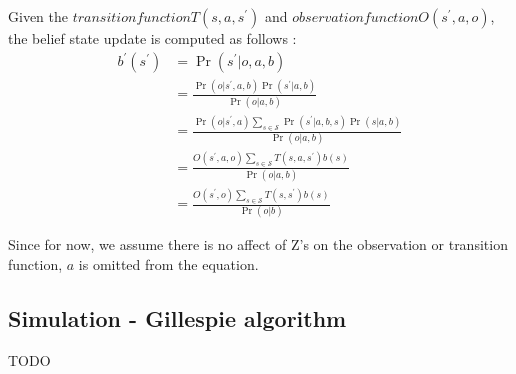 \documentclass[]{article}
\begin{document}
Given the $ transition function T(s, a, s^{\prime})$  and $ observation function O(s^{\prime}, a, o) $, the belief state update is computed as follows \cite{Kaelbling2011}:
\begin{equation}
\begin{aligned}
b^{\prime}\left(s^{\prime}\right) &=\operatorname{Pr}\left(s^{\prime} | o, a, b\right) \\
&=\frac{\operatorname{Pr}\left(o | s^{\prime}, a, b\right) \operatorname{Pr}\left(s^{\prime} | a, b\right)}{\operatorname{Pr}(o | a, b)} \\
&=\frac{\operatorname{Pr}\left(o | s^{\prime}, a\right) \sum_{s \in \mathcal{S}} \operatorname{Pr}\left(s^{\prime} | a, b, s\right) \operatorname{Pr}(s | a, b)}{\operatorname{Pr}(o | a, b)} \\
&=\frac{O\left(s^{\prime}, a, o\right) \sum_{s \in \mathcal{S}} T\left(s, a, s^{\prime}\right) b(s)}{\operatorname{Pr}(o | a, b)}\\
&=\frac{O\left(s^{\prime}, o\right) \sum_{s \in \mathcal{S}} T\left(s, s^{\prime}\right) b(s)}{\operatorname{Pr}(o | b)}
\end{aligned}
\end{equation}

Since for now, we assume there is no affect of Z's on the observation or transition function, $ a $ is omitted from the equation.

\subsection{Simulation - Gillespie algorithm}
TODO


\pagebreak


\end{document}
